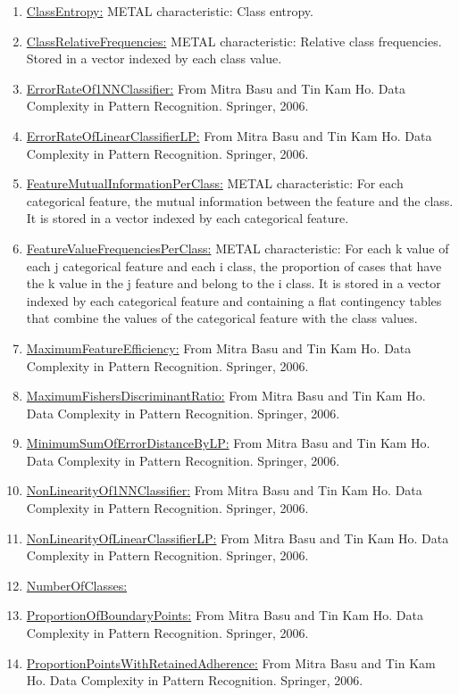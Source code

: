 \documentclass[a4paper,12pt, english]{article}
\begin{document}
\begin{enumerate}
\begin{enumerate}
\begin{enumerate}
\begin{enumerate}
\begin{enumerate}
				\item \underline{ClassEntropy:}  METAL characteristic: Class entropy.
				\item \underline{ClassRelativeFrequencies:} METAL characteristic: Relative class frequencies. Stored in a vector indexed by each class value.
				\item \underline{ErrorRateOf1NNClassifier:}  From Mitra Basu and Tin Kam Ho. Data Complexity in Pattern Recognition. Springer, 2006.
				\item \underline{ErrorRateOfLinearClassifierLP:} From Mitra Basu and Tin Kam Ho. Data Complexity in Pattern Recognition. Springer, 2006.
				\item \underline{FeatureMutualInformationPerClass:} METAL characteristic: For each categorical feature, the mutual information between the feature and the class. It is stored in a vector indexed by each categorical feature.
				\item \underline{FeatureValueFrequenciesPerClass:} METAL characteristic: For each k value of each j categorical feature and each i class, the proportion of cases that have the k value in the j feature and belong to the i class. It is stored in a vector indexed by each categorical feature and containing a flat contingency tables that combine the values of the categorical feature with the class values. 
				\item \underline{MaximumFeatureEfficiency:} From Mitra Basu and Tin Kam Ho. Data Complexity in Pattern Recognition. Springer, 2006.
				\item \underline{MaximumFishersDiscriminantRatio:}  From Mitra Basu and Tin Kam Ho. Data Complexity in Pattern Recognition. Springer, 2006.
				\item \underline{MinimumSumOfErrorDistanceByLP:}  From Mitra Basu and Tin Kam Ho. Data Complexity in Pattern Recognition. Springer, 2006.
				\item \underline{NonLinearityOf1NNClassifier:}  From Mitra Basu and Tin Kam Ho. Data Complexity in Pattern Recognition. Springer, 2006.
				\item \underline{NonLinearityOfLinearClassifierLP:}  From Mitra Basu and Tin Kam Ho. Data Complexity in Pattern Recognition. Springer, 2006.
				\item \underline{NumberOfClasses:}
				\item \underline{ProportionOfBoundaryPoints:}  From Mitra Basu and Tin Kam Ho. Data Complexity in Pattern Recognition. Springer, 2006.
				\item \underline{ProportionPointsWithRetainedAdherence:}  From Mitra Basu and Tin Kam Ho. Data Complexity in Pattern Recognition. Springer, 2006.

\end{enumerate}
\end{enumerate}
\end{enumerate}
\end{enumerate}
\end{enumerate}
\end{document}
